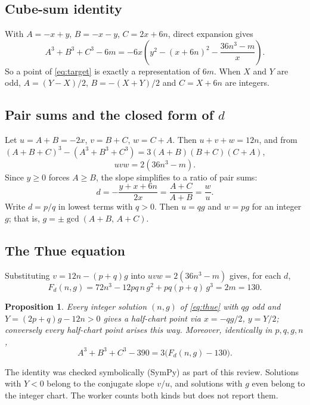 \documentclass[11pt,a4paper]{article}
\newtheorem{proposition}{Proposition}
\begin{document}
\subsection{Cube-sum identity}
With $A=-x+y$, $B=-x-y$, $C=2x+6n$, direct expansion gives
\begin{equation}
  A^3+B^3+C^3-6m=-6x\left(y^2-(x+6n)^2-\frac{36n^3-m}{x}\right).
\end{equation}
So a point of \eqref{eq:target} is exactly a representation of $6m$. When $X$ and $Y$ are
odd, $A=(Y-X)/2$, $B=-(X+Y)/2$ and $C=X+6n$ are integers.

\subsection{Pair sums and the closed form of $d$}
Let $u=A+B=-2x$, $v=B+C$, $w=C+A$. Then $u+v+w=12n$, and from
$(A+B+C)^3-(A^3+B^3+C^3)=3(A+B)(B+C)(C+A)$,
\begin{equation}
  uvw=2(36n^3-m).
\end{equation}
Since $y\ge0$ forces $A\ge B$, the slope simplifies to a ratio of pair sums:
\begin{equation}
  d=-\frac{y+x+6n}{2x}=\frac{A+C}{A+B}=\frac{w}{u}.
\end{equation}
Write $d=p/q$ in lowest terms with $q>0$. Then $u=qg$ and $w=pg$ for an integer $g$; that
is, $g=\pm\gcd(A+B,\,A+C)$.

\subsection{The Thue equation}
Substituting $v=12n-(p+q)g$ into $uvw=2(36n^3-m)$ gives, for each $d$,
\begin{equation}\label{eq:thue}
  F_d(n,g)=72n^3-12pq\,n\,g^2+pq(p+q)\,g^3=2m=130.
\end{equation}

\begin{proposition}
Every integer solution $(n,g)$ of \eqref{eq:thue} with $qg$ odd and $Y=(2p+q)g-12n>0$ gives
a half-chart point via $x=-qg/2$, $y=Y/2$; conversely every half-chart point arises this way.
Moreover, identically in $p,q,g,n$,
\[
  A^3+B^3+C^3-390=3\bigl(F_d(n,g)-130\bigr).
\]
\end{proposition}

The identity was checked symbolically (SymPy) as part of this review. Solutions with $Y<0$
belong to the conjugate slope $v/u$, and solutions with $g$ even belong to the integer
chart. The worker counts both kinds but does not report them.
\end{document}
